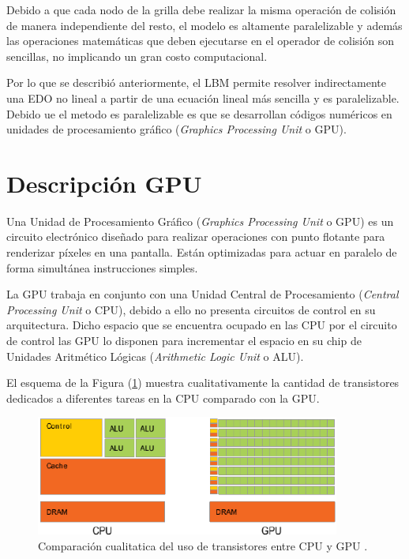 Debido a que cada nodo de la grilla debe realizar la misma operación de colisión de manera independiente del resto, el modelo es altamente paralelizable y además las operaciones matemáticas que deben ejecutarse en el operador de colisión son sencillas, no implicando un gran costo computacional.

Por lo que se describió anteriormente, el LBM permite resolver indirectamente una EDO no lineal a partir de una ecuación lineal más sencilla y es paralelizable. Debido ue el metodo es paralelizable es que se desarrollan códigos numéricos en unidades de procesamiento gráfico (\textit{Graphics Processing Unit} o GPU).
\newpage
\section{Descripción GPU}

Una Unidad de Procesamiento Gráfico (\textit{Graphics Processing Unit} o GPU) es un  circuito electrónico diseñado para realizar operaciones con punto flotante para renderizar píxeles en una pantalla. Están optimizadas para actuar en paralelo de forma simultánea instrucciones simples.

La GPU trabaja en conjunto con una Unidad Central de Procesamiento (\textit{Central Processing Unit} o CPU), debido a ello no presenta circuitos de control en su arquitectura. Dicho espacio que se encuentra ocupado en las CPU por el circuito de control las GPU lo disponen para incrementar el espacio en su chip de Unidades Aritmético Lógicas (\textit{Arithmetic Logic Unit} o ALU).

El esquema de la Figura (\ref{fig:cpu_gpu_transis}) muestra cualitativamente la cantidad de transistores dedicados a diferentes tareas en la CPU comparado con la GPU.

\begin{figure}[h!]
	\centering
	\includegraphics[width=10cm]{cpu_gpu.png}
	\caption{Comparación cualitatica del uso de transistores entre CPU y GPU \cite{rinaldi2011modelos}.}
	\label{fig:cpu_gpu_transis}
\end{figure}

